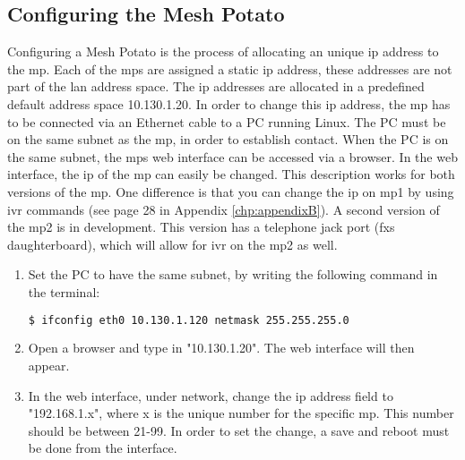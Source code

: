 \subsection{Configuring the Mesh Potato}
\label{subsec:configuring}
Configuring a Mesh Potato is the process of allocating an unique \gls{ip} address to the \gls{mp}. Each of the \glspl{mp} are assigned a static \gls{ip} address, these addresses are not part of the \gls{lan} address space. The \gls{ip} addresses are allocated in a predefined default address space 10.130.1.20. In order to change this \gls{ip} address, the \gls{mp} has to be connected via an Ethernet cable to a PC running Linux. The PC must be on the same subnet as the \gls{mp}, in order to establish contact. When the PC is on the same subnet, the \glspl{mp} web interface can be accessed via a browser. In the web interface, the \gls{ip} of the \gls{mp} can easily be changed. This description works for both versions of the \gls{mp}. One difference is that you can change the \gls{ip} on \gls{mp1} by using \gls{ivr} commands (see page 28 in Appendix \ref{chp:appendixB}). A second version of the \gls{mp2} is in development. This version has a telephone jack port (\gls{fxs} daughterboard), which will allow for \gls{ivr} on the \gls{mp2} as well. 

\begin{enumerate}
\item Set the PC to have the same subnet, by writing the following command in the terminal:
\noindent
\begin{lstlisting}[language=bash]
  $ ifconfig eth0 10.130.1.120 netmask 255.255.255.0
\end{lstlisting}
\item Open a browser and type in "10.130.1.20". The web interface will then appear. 
\item In the web interface, under network, change the \gls{ip} address field to "192.168.1.x", where x is the unique number for the specific \gls{mp}. This number should be between 21-99. In order to set the change, a save and reboot must be done from the interface. 
\end{enumerate}

